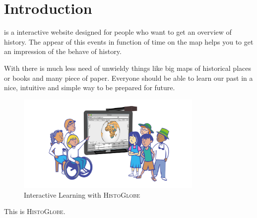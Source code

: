 \section{Introduction} %
\label{sec:introduction}

\HG is a interactive website designed for people who want to get an overview of history. The appear of this events in function of time on the map helps you to get an impression of the behave of history.

With \HG there is much less need of unwieldy things like big maps of historical places or books and many piece of paper. Everyone should be able to learn our past in a nice, intuitive and simple way to be prepared for future.

\begin{figure}[H]
	\centering
	\includegraphics[width=0.8\textwidth]{graphics/everybody.jpg}
	\caption{Interactive Learning with \textsc{HistoGlobe}}
	\label{fig:everybody}
\end{figure}

This is \textsc{HistoGlobe}.

